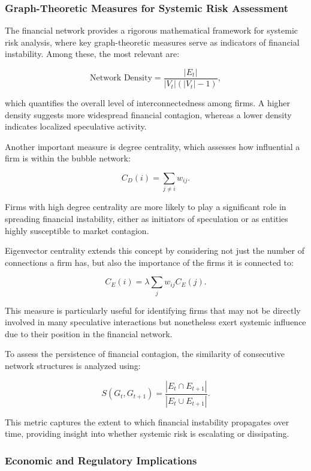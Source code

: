 \documentclass[preprint,12pt,authoryear]{elsarticle}
\begin{document}
\subsubsection{Graph-Theoretic Measures for Systemic Risk Assessment}  

The financial network provides a rigorous mathematical framework for systemic risk analysis, where key graph-theoretic measures serve as indicators of financial instability. Among these, the most relevant are:

\[
\text{Network Density} = \frac{|E_t|}{|V_t|(|V_t| - 1)},
\]

which quantifies the overall level of interconnectedness among firms. A higher density suggests more widespread financial contagion, whereas a lower density indicates localized speculative activity.

Another important measure is degree centrality, which assesses how influential a firm is within the bubble network:

\[
C_D(i) = \sum_{j \neq i} w_{ij}.
\]

Firms with high degree centrality are more likely to play a significant role in spreading financial instability, either as initiators of speculation or as entities highly susceptible to market contagion.

Eigenvector centrality extends this concept by considering not just the number of connections a firm has, but also the importance of the firms it is connected to:

\[
C_E(i) = \lambda \sum_{j} w_{ij} C_E(j).
\]

This measure is particularly useful for identifying firms that may not be directly involved in many speculative interactions but nonetheless exert systemic influence due to their position in the financial network.

To assess the persistence of financial contagion, the similarity of consecutive network structures is analyzed using:

\[
S(G_t, G_{t+1}) = \frac{| E_t \cap E_{t+1} |}{| E_t \cup E_{t+1} |}.
\]

This metric captures the extent to which financial instability propagates over time, providing insight into whether systemic risk is escalating or dissipating.

\subsubsection{Economic and Regulatory Implications}  
\end{document}
